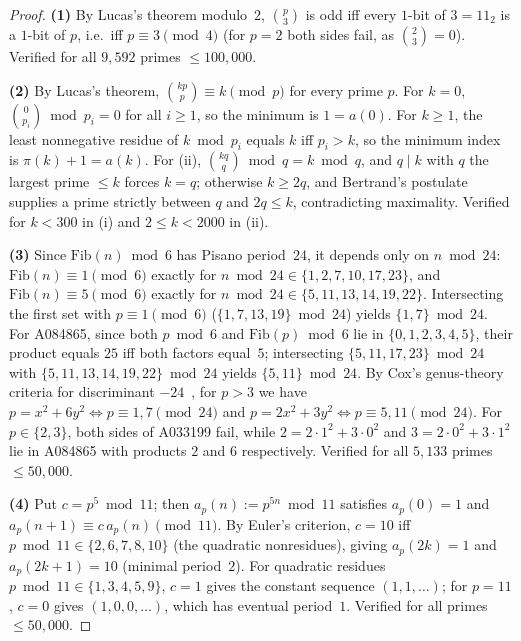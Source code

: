 \documentclass[11pt]{article}
\begin{document}
\begin{proof}
\textbf{(1)} By Lucas's theorem modulo~$2$, $\binom{p}{3}$ is odd iff every $1$-bit of $3 = 11_2$ is a $1$-bit of $p$, i.e.\ iff $p \equiv 3 \pmod{4}$ (for $p=2$ both sides fail, as $\binom{2}{3} = 0$). Verified for all $9{,}592$ primes $\le 100{,}000$.

\textbf{(2)} By Lucas's theorem, $\binom{kp}{p} \equiv k \pmod{p}$ for every prime $p$. For $k = 0$, $\binom{0}{p_i} \bmod p_i = 0$ for all $i \ge 1$, so the minimum is $1 = a(0)$. For $k \ge 1$, the least nonnegative residue of $k \bmod p_i$ equals $k$ iff $p_i > k$, so the minimum index is $\pi(k) + 1 = a(k)$. For (ii), $\binom{kq}{q} \bmod q = k \bmod q$, and $q \mid k$ with $q$ the largest prime $\le k$ forces $k = q$; otherwise $k \ge 2q$, and Bertrand's postulate supplies a prime strictly between $q$ and $2q \le k$, contradicting maximality. Verified for $k < 300$ in (i) and $2 \le k < 2000$ in (ii).

\textbf{(3)} Since $\mathrm{Fib}(n) \bmod 6$ has Pisano period~$24$, it depends only on $n \bmod 24$: $\mathrm{Fib}(n) \equiv 1 \pmod{6}$ exactly for $n \bmod 24 \in \{1, 2, 7, 10, 17, 23\}$, and $\mathrm{Fib}(n) \equiv 5 \pmod{6}$ exactly for $n \bmod 24 \in \{5, 11, 13, 14, 19, 22\}$. Intersecting the first set with $p \equiv 1 \pmod{6}$ ($\{1,7,13,19\} \bmod 24$) yields $\{1,7\} \bmod 24$. For A084865, since both $p \bmod 6$ and $\mathrm{Fib}(p) \bmod 6$ lie in $\{0,1,2,3,4,5\}$, their product equals $25$ iff both factors equal~$5$; intersecting $\{5,11,17,23\} \bmod 24$ with $\{5,11,13,14,19,22\} \bmod 24$ yields $\{5,11\} \bmod 24$. By Cox's genus-theory criteria for discriminant $-24$~\cite[Ch.~1, \S\S 2--3]{Cox2013}, for $p > 3$ we have $p = x^2 + 6y^2 \iff p \equiv 1,7 \pmod{24}$ and $p = 2x^2 + 3y^2 \iff p \equiv 5,11 \pmod{24}$. For $p \in \{2,3\}$, both sides of A033199 fail, while $2 = 2\cdot 1^2 + 3\cdot 0^2$ and $3 = 2\cdot 0^2 + 3\cdot 1^2$ lie in A084865 with products $2$ and $6$ respectively. Verified for all $5{,}133$ primes $\le 50{,}000$.

\textbf{(4)} Put $c = p^5 \bmod 11$; then $a_p(n) := p^{5n} \bmod 11$ satisfies $a_p(0) = 1$ and $a_p(n+1) \equiv c\,a_p(n) \pmod{11}$. By Euler's criterion, $c = 10$ iff $p \bmod 11 \in \{2,6,7,8,10\}$ (the quadratic nonresidues), giving $a_p(2k) = 1$ and $a_p(2k+1) = 10$ (minimal period~$2$). For quadratic residues $p \bmod 11 \in \{1,3,4,5,9\}$, $c = 1$ gives the constant sequence $(1,1,\dots)$; for $p = 11$, $c = 0$ gives $(1,0,0,\dots)$, which has eventual period~$1$. Verified for all primes $\le 50{,}000$.


\end{proof}
\end{document}
